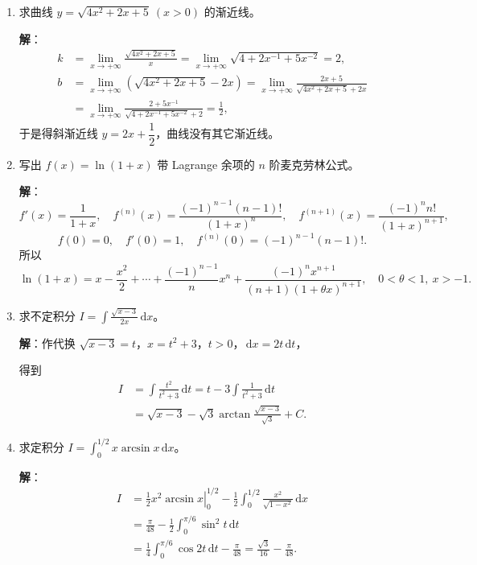 \documentclass[a4paper,11pt]{ctexart}
\newcommand{\dd}{\,\mathrm{d}}
\newcommand{\score}[1]{\hfill{\text{（#1 分）}}}
\begin{document}
\begin{enumerate}[label=\arabic*., start=11, leftmargin=2em, itemsep=1.0em, topsep=0.6em]
  \item 求曲线 $y=\sqrt{4x^2+2x+5}\ (x>0)$ 的渐近线。

  \textbf{解}：
  \begin{align*}
    k &= \lim_{x\to+\infty}\frac{\sqrt{4x^2+2x+5}}{x} = \lim_{x\to+\infty}\sqrt{4+2x^{-1}+5x^{-2}} = 2, \tag*{（3 分）}\\
    b &= \lim_{x\to+\infty}\left(\sqrt{4x^2+2x+5}-2x\right) = \lim_{x\to+\infty}\frac{2x+5}{\sqrt{4x^2+2x+5}+2x} \\
      &= \lim_{x\to+\infty}\frac{2+5x^{-1}}{\sqrt{4+2x^{-1}+5x^{-2}}+2} = \frac{1}{2}, \tag*{（6 分）}
  \end{align*}
  于是得斜渐近线 $y=2x+\dfrac{1}{2}$，曲线没有其它渐近线。\score{7}

  \item 写出 $f(x)=\ln(1+x)$ 带 Lagrange 余项的 $n$ 阶麦克劳林公式。

  \textbf{解}：
  \[
    f'(x)=\frac{1}{1+x},\quad
    f^{(n)}(x)=\frac{(-1)^{n-1}(n-1)!}{(1+x)^n},\quad
    f^{(n+1)}(x)=\frac{(-1)^n n!}{(1+x)^{n+1}}, \tag*{（3 分）}
  \]
  \[
    f(0)=0,\quad f'(0)=1,\quad f^{(n)}(0)=(-1)^{n-1}(n-1)!. \tag*{（5 分）}
  \]
  所以
  \[
    \ln(1+x)=x-\frac{x^2}{2}+\cdots+\frac{(-1)^{n-1}}{n}x^n+\frac{(-1)^n x^{n+1}}{(n+1)(1+\theta x)^{n+1}},\quad 0<\theta<1,\ x>-1. \tag*{（7 分）}
  \]

  \item 求不定积分 $I=\displaystyle\int\frac{\sqrt{x-3}}{2x}\dd x$。

  \textbf{解}：作代换 $\sqrt{x-3}=t$，$x=t^2+3$，$t>0$，$\dd x=2t\dd t$，\score{2}

  得到
  \begin{align*}
    I &= \int\frac{t^2}{t^2+3}\dd t = t - 3\int\frac{1}{t^2+3}\dd t \tag*{（5 分）}\\
      &= \sqrt{x-3} - \sqrt{3}\arctan\frac{\sqrt{x-3}}{\sqrt{3}} + C. \tag*{（7 分）}
  \end{align*}

  \item 求定积分 $I=\displaystyle\int_0^{1/2} x\arcsin x\dd x$。

  \textbf{解}：
  \begin{align*}
    I &= \left.\frac{1}{2}x^2\arcsin x\right|_0^{1/2} - \frac{1}{2}\int_0^{1/2}\frac{x^2}{\sqrt{1-x^2}}\dd x \tag*{（3 分）}\\
      &= \frac{\pi}{48} - \frac{1}{2}\int_0^{\pi/6}\sin^2 t\dd t \tag*{（5 分）}\\
      &= \frac{1}{4}\int_0^{\pi/6}\cos 2t\dd t - \frac{\pi}{48} = \frac{\sqrt{3}}{16} - \frac{\pi}{48}. \tag*{（7 分）}
  \end{align*}


\end{enumerate}
\end{document}
